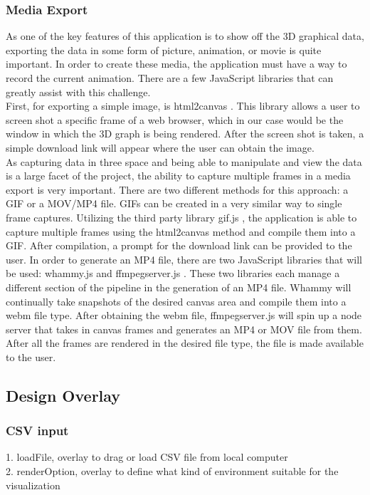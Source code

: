 \documentclass[journal,10pt,onecolumn,compsoc]{IEEEtran} \usepackage[margin=1.0in]{geometry} \usepackage{pdfpages}
\begin{document}
        \subsubsection{Media Export}
        As one of the key features of this application is to show off the 3D graphical data, exporting the data in some form of picture, animation, or movie is quite important. In order to create these media, the application must have a way to record the current animation. There are a few JavaScript libraries that can greatly assist with this challenge. \\
        First, for exporting a simple image, is html2canvas \cite{html2canvas}. This library allows a user to screen shot a specific frame of a web browser, which in our case would be the window in which the 3D graph is being rendered. After the screen shot is taken, a simple download link will appear where the user can obtain the image.\\
        As capturing data in three space and being able to manipulate and view the data is a large facet of the project, the ability to capture multiple frames in a media export is very important. There are two different methods for this approach: a GIF or a MOV/MP4 file. GIFs can be created in a very similar way to single frame captures. Utilizing the third party library gif.js \cite{gif.js}, the application is able to capture multiple frames using the html2canvas method and compile them into a GIF. After compilation, a prompt for the download link can be provided to the user. In order to generate an MP4 file, there are two JavaScript libraries that will be used: whammy.js\cite{whammy.js} and ffmpegserver.js \cite{ffmpegserver.js}. These two libraries each manage a different section of the pipeline in the generation of an MP4 file. Whammy will continually take snapshots of the desired canvas area and compile them into a webm file type. After obtaining the webm file, ffmpegserver.js will spin up a node server that takes in canvas frames and generates an MP4 or MOV file from them. After all the frames are rendered in the desired file type, the file is made available to the user.
    \subsection{Design Overlay}
        \subsubsection{CSV input}
        1. loadFile, overlay to drag or load CSV file from local computer\\
        2. renderOption, overlay to define what kind of environment suitable for the visualization
        
\end{document}
